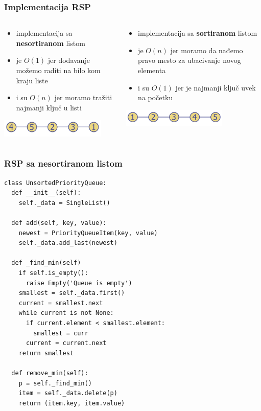 \documentclass[compress,aspectratio=169]{beamer}
\begin{document}
\begin{frame}[fragile]
\frametitle{Implementacija RSP}
\begin{columns}
  \begin{column}[c]{5.5cm}
    \begin{itemize}
      \item implementacija sa \textbf{nesortiranom} listom
      \item {} je $O(1)$ jer dodavanje možemo raditi na bilo kom kraju liste
      \item {} i  su $O(n)$ jer moramo tražiti najmanji ključ u listi
    \end{itemize}
    \begin{center}
      \includegraphics[width=5cm]{asp-09-pic01a.png}
    \end{center}
  \end{column}
  \begin{column}[c]{5.5cm}
    \begin{itemize}
      \item implementacija sa \textbf{sortiranom} listom
      \item {} je $O(n)$ jer moramo da nađemo pravo mesto za ubacivanje novog elementa
      \item {} i  su $O(1)$ jer je najmanji ključ uvek na početku
    \end{itemize}
    \begin{center}
      \includegraphics[width=5cm]{asp-09-pic01b.png}
    \end{center}
  \end{column}
\end{columns}
\end{frame}

\begin{frame}
  \frametitle{RSP sa nesortiranom listom}
\begin{verbatim}
class UnsortedPriorityQueue:
  def __init__(self):
    self._data = SingleList()
    
  def add(self, key, value):
    newest = PriorityQueueItem(key, value) 
    self._data.add_last(newest)
    
  def _find_min(self)
    if self.is_empty():
      raise Empty('Queue is empty')
    smallest = self._data.first()
    current = smallest.next
    while current is not None:
      if current.element < smallest.element:
        smallest = curr
      current = current.next
    return smallest
  
  def remove_min(self):
    p = self._find_min()
    item = self._data.delete(p)
    return (item.key, item.value)
\end{verbatim}
\end{frame}
\end{document}

